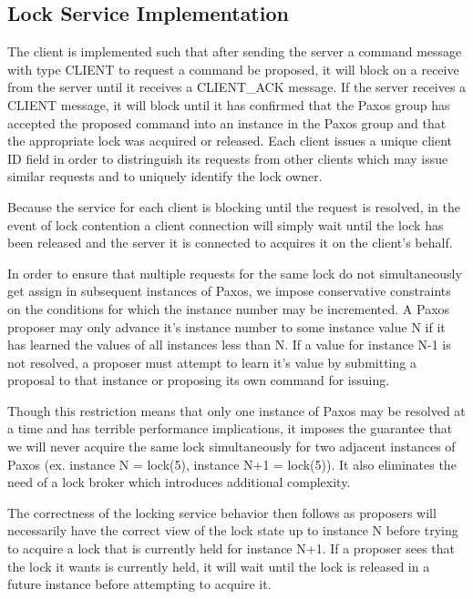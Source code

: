 \documentclass{article}
\begin{document}
\subsection{Lock Service Implementation}

The client is implemented such that after sending the server a command message with type CLIENT to request a command be proposed, it will block on a receive from the server until it receives a CLIENT\_ACK message.
If the server receives a CLIENT message, it will block until it has confirmed that the Paxos group has accepted the proposed command into an instance in the Paxos group and that the appropriate lock was acquired or released.
Each client issues a unique client ID field in order to distringuish its requests from other clients which may issue similar requests and to uniquely identify the lock owner.

Because the service for each client is blocking until the request is resolved, in the event of lock contention a client connection will simply wait until the lock has been released and the server it is connected to acquires it on the client's behalf.

In order to ensure that multiple requests for the same lock do not simultaneously get assign in subsequent instances of Paxos, we impose conservative constraints on the conditions for which the instance number may be incremented.
A Paxos proposer may only advance it's instance number to some instance value N if it has learned the values of all instances less than N.
If a value for instance N-1 is not resolved, a proposer must attempt to learn it's value by submitting a proposal to that instance or proposing its own command for issuing.

Though this restriction means that only one instance of Paxos may be resolved at a time and has terrible performance implications, it imposes the guarantee that we will never acquire the same lock simultaneously for two adjacent instances of Paxos (ex. instance N = lock(5), instance N+1 = lock(5)).
It also eliminates the need of a lock broker which introduces additional complexity.

The correctness of the locking service behavior then follows as proposers will necessarily have the correct view of the lock state up to instance N before trying to acquire a lock that is currently held for instance N+1.
If a proposer sees that the lock it wants is currently held, it will wait until the lock is released in a future instance before attempting to acquire it.
\end{document}
